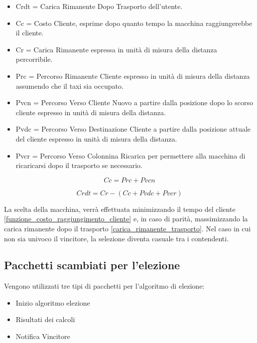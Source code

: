 \begin{itemize}
	\item Crdt = Carica Rimanente Dopo Trasporto dell'utente.
	\item Cc = Costo Cliente, esprime dopo quanto tempo la macchina raggiungerebbe il cliente.
	\item Cr = Carica Rimanente espressa in unità di misura della distanza percorribile.
	\item Prc = Percorso Rimanente Cliente espresso in unità di misura della distanza assumendo che il taxi sia occupato.
	\item Pvcn = Percorso Verso Cliente Nuovo a partire dalla posizione dopo lo scorso cliente espresso in unità di misura della distanza.
	\item Pvdc = Percorso Verso Destinazione Cliente a partire dalla posizione attuale del cliente espresso in unità di misura della distanza.
	\item Pvcr = Percorso Verso Colonnina Ricarica per permettere alla macchina di ricaricarsi dopo il trasporto se necessario.
\end{itemize}

\begin{equation} \label{funzione_costo_raggiungimento_cliente}
Cc = Prc + Pvcn
\end{equation}

\begin{equation} \label{carica_rimanente_trasporto}
Crdt = Cr - (Cc + Pvdc + Pvcr)
\end{equation}

La scelta della macchina, verrà effettuata minimizzando il tempo del cliente \ref{funzione_costo_raggiungimento_cliente} e, in caso di parità, massimizzando la carica rimanente dopo il trasporto \ref{carica_rimanente_trasporto}. Nel caso in cui non sia univoco il vincitore, la selezione diventa casuale tra i contendenti.

\subsection{Pacchetti scambiati per l'elezione}\label{descrizione_pacchetto}
Vengono utilizzati tre tipi di pacchetti per l'algoritmo di elezione:
\begin{itemize}
	\item Inizio algoritmo elezione
	\item Risultati dei calcoli
	\item Notifica Vincitore
\end{itemize}

